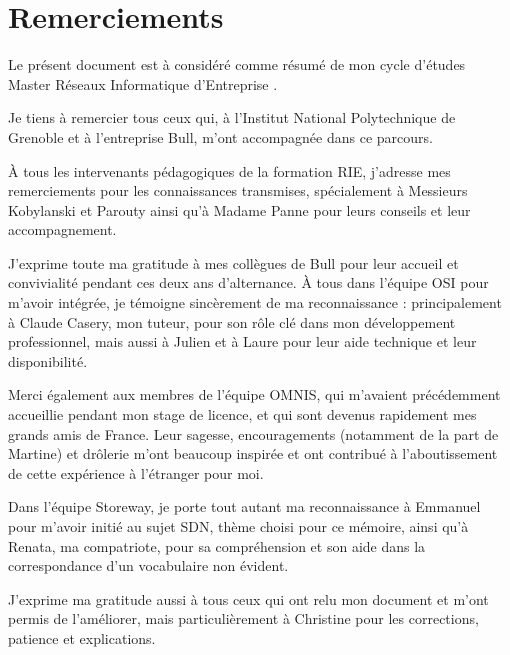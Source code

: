\documentclass[a4paper,12pt,bibliography=totoc,index=totoc,twoside,francais]{scrbook}
\begin{document}


\frontmatter

\section*{Remerciements}

Le présent document est à considéré comme résumé de mon cycle d'études \og Master Réseaux Informatique d'Entreprise \fg{}.

Je tiens à  remercier tous ceux qui, à l'Institut National Polytechnique de Grenoble et à l'entreprise Bull, m'ont accompagnée dans ce parcours. 

À tous les intervenants pédagogiques de la formation RIE, j'adresse mes remerciements pour les connaissances transmises,  spécialement à Messieurs Kobylanski et Parouty ainsi qu'à Madame Panne pour leurs conseils et leur accompagnement.

J'exprime toute ma gratitude à mes collègues de Bull pour leur accueil et convivialité pendant ces deux ans d'alternance. À tous dans l'équipe OSI pour m'avoir intégrée, je témoigne sincèrement de ma reconnaissance : principalement à Claude Casery, mon tuteur, pour son rôle clé dans mon développement professionnel, mais aussi à Julien et à Laure pour leur aide technique et leur disponibilité.

Merci également aux membres de l'équipe OMNIS, qui m'avaient précédemment accueillie pendant mon stage de licence, et qui sont devenus rapidement mes grands amis de France. Leur sagesse, encouragements (notamment de la part de Martine) et drôlerie m'ont beaucoup inspirée et ont contribué à l'aboutissement de cette expérience à l'étranger pour moi. 

Dans l'équipe Storeway, je porte tout autant ma reconnaissance à Emmanuel pour m'avoir initié au sujet SDN, thème choisi pour ce mémoire, ainsi qu'à Renata, ma compatriote, pour sa compréhension et son aide dans la correspondance d'un vocabulaire non évident. 

J'exprime ma gratitude aussi à tous ceux qui ont relu mon document et m'ont permis de l'améliorer, mais particulièrement à Christine pour les corrections, patience et explications.
\end{document}
